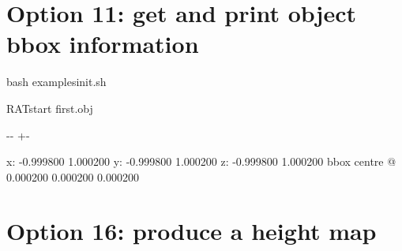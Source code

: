 \documentclass[letterpaper,10pt,english]{sphinxmanual}
\newlength\nbsphinxcodecellspacing
\begin{document}
\section{Option 11: get and print object bbox information}
\label{\detokenize{RATstartOptions:Option-11:-get-and-print-object-bbox-information}}
\begin{sphinxVerbatim}[commandchars=\\\{\}]
                        
\end{sphinxVerbatim}

{
\begin{sphinxVerbatim}[commandchars=\\\{\}]
\llap{\color{nbsphinxin}[17]:\,\hspace{\fboxrule}\hspace{\fboxsep}}\PYGZpc{}\PYGZpc{}bash
 examples\PYGZus{}init.sh

RATstart first.obj  
\end{sphinxVerbatim}
}

{

\kern-\sphinxverbatimsmallskipamount\kern-\baselineskip
\kern+\FrameHeightAdjust\kern-\fboxrule
\vspace{\nbsphinxcodecellspacing}

\begin{sphinxVerbatim}[commandchars=\\\{\}]
x: -0.999800 1.000200
y: -0.999800 1.000200
z: -0.999800 1.000200
bbox centre @ 0.000200 0.000200 0.000200
\end{sphinxVerbatim}
}


\section{Option 16: produce a height map}
\label{\detokenize{RATstartOptions:Option-16:-produce-a-height-map}}
\begin{sphinxVerbatim}[commandchars=\\\{\}]
                
\end{sphinxVerbatim}
\end{document}
